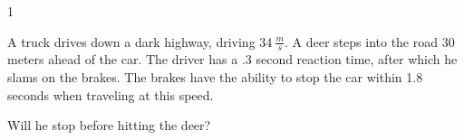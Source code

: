 
\AddToShipoutPicture*{\BackgroundPic}

\addtocounter {ProbNum} {1}

 
{\bf \Large{}} A truck drives down a dark highway, driving ${34~\tfrac{m}{s}}$.  A deer steps into the road 30 meters ahead of the car.  The driver has a .3 second reaction time, after which he slams on the brakes.  The brakes have the ability to stop the car within 1.8 seconds when traveling at this speed.  \bigskip

Will he stop before hitting the deer?  
\paragraph{}
\noindent
\vfill





\newpage